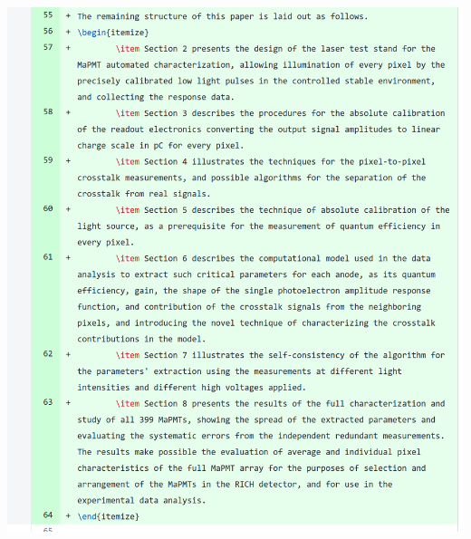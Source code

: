 \documentclass[11pt]{report}
\begin{document}
\includegraphics[width=0.8\linewidth]{round1/add1.png}
\end{document}
